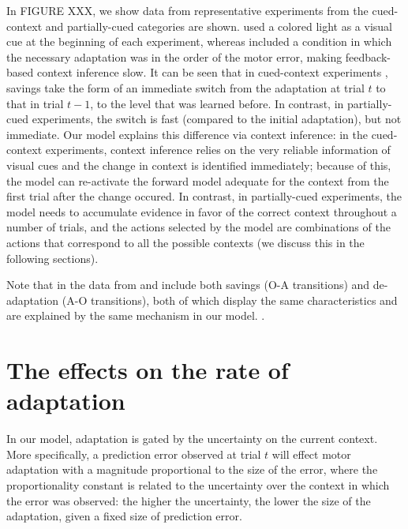 \documentclass[a4paper,doc,floatsintext,natbib]{apa6}
\begin{document}
In FIGURE XXX, we show data from representative experiments from the cued-context \citep{Kim_Neural_2015} and partially-cued \citep[][group 1c]{Oh_Minimizing_2019} categories are shown. \cite{Kim_Neural_2015} used a colored light as a visual cue at the beginning of each experiment, whereas \cite{Oh_Minimizing_2019} included a condition in which the necessary adaptation was in the order of the motor error, making feedback-based context inference slow. It can be seen that in cued-context experiments \cite[data from][]{Oh_Minimizing_2019}, savings take the form of an immediate switch from the adaptation at trial $t$ to that in trial $t-1$, to the level that was learned before. In contrast, in partially-cued experiments, the switch is fast (compared to the initial adaptation), but not immediate. Our model explains this difference via context inference: in the cued-context experiments, context inference relies on the very reliable information of visual cues and the change in context is identified immediately; because of this, the model can re-activate the forward model adequate for the context from the first trial after the change occured. In contrast, in partially-cued experiments, the model needs to accumulate evidence in favor of the correct context throughout a number of trials, and the actions selected by the model are combinations of the actions that correspond to all the possible contexts (we discuss this in the following sections).

Note that in the data from \cite{Oh_Minimizing_2019} and \cite{Kim_Neural_2015} include both savings (O-A transitions) and de-adaptation (A-O transitions), both of which display the same characteristics and are explained by the same mechanism in our model. .


\section{The effects on the rate of adaptation}
In our model, adaptation is gated by the uncertainty on the current context. More specifically, a prediction error observed at trial $t$ will effect motor adaptation with a magnitude proportional to the size of the error, where the proportionality constant is related to the uncertainty over the context in which the error was observed: the higher the uncertainty, the lower the size of the adaptation, given a fixed size of prediction error.
\end{document}
